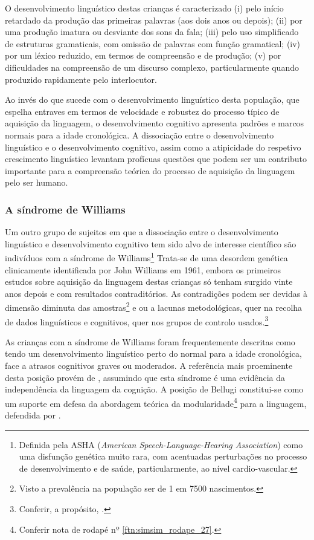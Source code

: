 \documentclass[output=paper]{LSP/langsci}
\begin{document}
O desenvolvimento linguístico destas crianças é caracterizado (i) pelo início retardado da produção das primeiras palavras (aos dois anos ou depois); (ii) por uma produção imatura ou desviante dos sons da fala; (iii) pelo uso simplificado de estruturas gramaticais, com omissão de palavras com função gramatical; (iv) por um léxico reduzido, em termos de compreensão e de produção; (v) por dificuldades na compreensão de um discurso complexo, particularmente quando produzido rapidamente pelo interlocutor.

Ao invés do que sucede com o desenvolvimento linguístico desta população, que espelha entraves em termos de velocidade e robustez do processo típico de aquisição da linguagem, o desenvolvimento cognitivo apresenta padrões e marcos normais para a idade cronológica. A dissociação entre o desenvolvimento linguístico e o desenvolvimento cognitivo, assim como a atipicidade do respetivo crescimento linguístico levantam profícuas questões que podem ser um contributo importante para a compreensão teórica do processo de aquisição da linguagem pelo ser humano.

\subsubsection{A síndrome de Williams}
\label{subsubsec:simsim_williams}
Um outro grupo de sujeitos em que a dissociação entre o desenvolvimento linguístico e desenvolvimento cognitivo tem sido alvo de interesse científico são indivíduos com a síndrome de Williams\footnote{Definida pela ASHA (\textit{American Speech-Language-Hearing Association}) como uma disfunção genética muito rara, com acentuadas perturbações no processo de desenvolvimento e de saúde, particularmente, ao nível cardio-vascular.} Trata-se de uma desordem genética clinicamente identificada por John Williams em 1961, embora os primeiros estudos sobre aquisição da linguagem destas crianças só tenham surgido vinte anos depois e com resultados contraditórios. As contradições podem ser devidas à dimensão diminuta das amostras\footnote{Visto a prevalência na população ser de 1 em 7500 nascimentos.} e ou a lacunas metodológicas, quer na recolha de dados linguísticos e cognitivos, quer nos grupos de controlo usados.\footnote{Conferir, a propósito, \citet{brock2007}.}

As crianças com a síndrome de Williams foram frequentemente descritas como tendo um desenvolvimento linguístico perto do normal para a idade cronológica, face a atrasos cognitivos graves ou moderados. A referência mais proeminente desta posição provém de \citet{bellugi_etal1988}, assumindo que esta síndrome é uma evidência da independência da linguagem da cognição. A posição de Bellugi constitui-se como um suporte em defesa da abordagem teórica da modularidade\footnote{Conferir nota de rodapé nº \ref{ftn:simsim_rodape_27}.} para a linguagem, defendida por \citet{fodor1983}.
\end{document}
